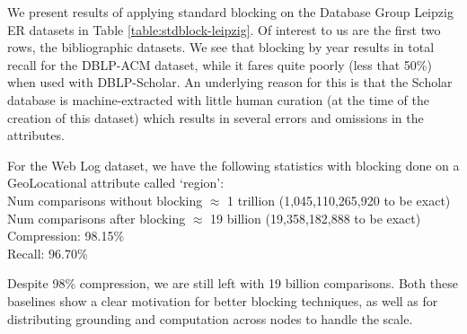 \documentclass{article}
\begin{document}
We present results of applying standard blocking on the Database Group Leipzig ER datasets in Table \ref{table:stdblock-leipzig}. Of interest to us are the first two rows, the bibliographic datasets. We see that blocking by year results in total recall for the DBLP-ACM dataset, while it fares quite poorly (less that 50\%) when used with DBLP-Scholar. An underlying reason for this is that the Scholar database is machine-extracted with little human curation (at the time of the creation of this dataset) which results in several errors and omissions in the attributes.

For the Web Log dataset, we have the following statistics with blocking done on a GeoLocational attribute called `region':\\
Num comparisons without blocking $\approx$ 1 trillion (1,045,110,265,920 to be exact)\\
Num comparisons after blocking $\approx$ 19 billion (19,358,182,888 to be exact)\\
Compression: 98.15\%\\
Recall: 96.70\%

Despite 98\% compression, we are still left with 19 billion comparisons. Both these baselines show a clear motivation for better blocking techniques, as well as for distributing grounding and computation across nodes to handle the scale.
\end{document}
